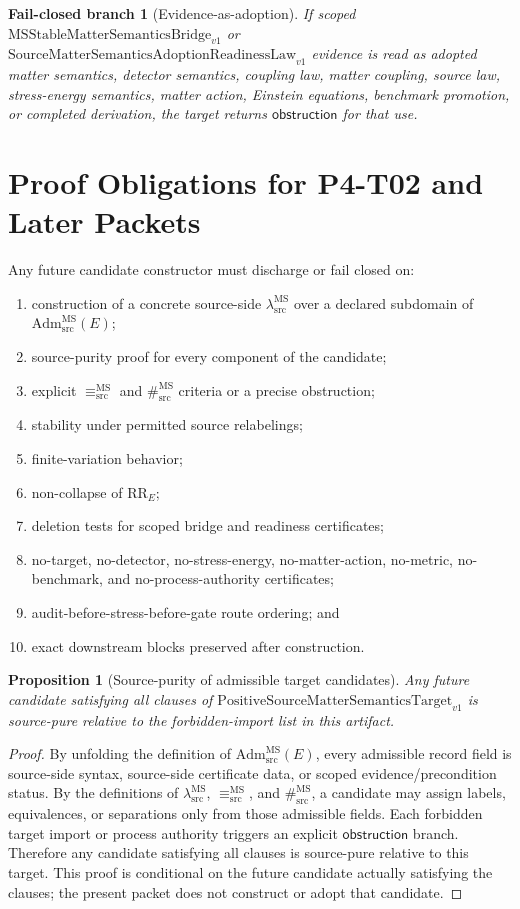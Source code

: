 \documentclass[11pt]{article}
\newcommand{\MSBridge}{\mathrm{MSStableMatterSemanticsBridge}_{v1}}
\newcommand{\SMSAR}{\mathrm{SourceMatterSemanticsAdoptionReadinessLaw}_{v1}}
\newcommand{\PMSTarget}{\mathrm{PositiveSourceMatterSemanticsTarget}_{v1}}
\newcommand{\AdmSrc}{\mathrm{Adm}^{\mathrm{MS}}_{\mathrm{src}}}
\newcommand{\lambdaSrc}{\lambda^{\mathrm{MS}}_{\mathrm{src}}}
\newcommand{\EqMS}{\equiv^{\mathrm{MS}}_{\mathrm{src}}}
\newcommand{\SepMS}{\#^{\mathrm{MS}}_{\mathrm{src}}}
\newcommand{\Obstruction}{\mathsf{obstruction}}
\newcommand{\RRE}{\mathrm{RR}_E}
\newtheorem{proposition}{Proposition}
\newtheorem{failure}{Fail-closed branch}
\begin{document}
\begin{failure}[Evidence-as-adoption]
If scoped \(\MSBridge\) or \(\SMSAR\) evidence is read as adopted matter
semantics, detector semantics, coupling law, matter coupling, source law,
stress-energy semantics, matter action, Einstein equations, benchmark
promotion, or completed derivation, the target returns \(\Obstruction\) for
that use.
\end{failure}

\section{Proof Obligations for P4-T02 and Later Packets}

Any future candidate constructor must discharge or fail closed on:
\begin{enumerate}[label=O\arabic*.,leftmargin=*]
  \item construction of a concrete source-side \(\lambdaSrc\) over a declared
  subdomain of \(\AdmSrc(E)\);
  \item source-purity proof for every component of the candidate;
  \item explicit \(\EqMS\) and \(\SepMS\) criteria or a precise obstruction;
  \item stability under permitted source relabelings;
  \item finite-variation behavior;
  \item non-collapse of \(\RRE\);
  \item deletion tests for scoped bridge and readiness certificates;
  \item no-target, no-detector, no-stress-energy, no-matter-action, no-metric,
  no-benchmark, and no-process-authority certificates;
  \item audit-before-stress-before-gate route ordering; and
  \item exact downstream blocks preserved after construction.
\end{enumerate}

\begin{proposition}[Source-purity of admissible target candidates]
Any future candidate satisfying all clauses of \(\PMSTarget\) is source-pure
relative to the forbidden-import list in this artifact.
\end{proposition}

\begin{proof}
By unfolding the definition of \(\AdmSrc(E)\), every admissible record field is
source-side syntax, source-side certificate data, or scoped evidence/precondition
status. By the definitions of \(\lambdaSrc\), \(\EqMS\), and \(\SepMS\), a
candidate may assign labels, equivalences, or separations only from those
admissible fields. Each forbidden target import or process authority triggers
an explicit \(\Obstruction\) branch. Therefore any candidate satisfying all
clauses is source-pure relative to this target. This proof is conditional on
the future candidate actually satisfying the clauses; the present packet does
not construct or adopt that candidate.
\end{proof}
\end{document}
